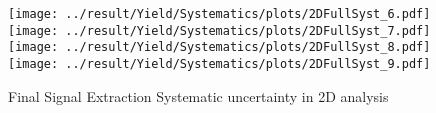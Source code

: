 \begin{figure}
	\centering
		\texttt{[image: ../result/Yield/Systematics/plots/2DFullSyst\_6.pdf]}
		\texttt{[image: ../result/Yield/Systematics/plots/2DFullSyst\_7.pdf]}\\
		\texttt{[image: ../result/Yield/Systematics/plots/2DFullSyst\_8.pdf]}
		\texttt{[image: ../result/Yield/Systematics/plots/2DFullSyst\_9.pdf]}
		\caption{Final Signal Extraction Systematic uncertainty in 2D analysis}
		\label{}
\end{figure}